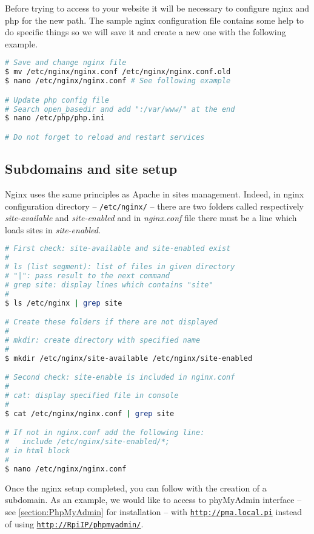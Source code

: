 Before trying to access to your website it will be necessary to configure nginx 
and php for the new path. The sample nginx configuration file contains some 
help to do specific things so we will save it and create a new one with the 
following example.

\begin{lstlisting}[language=bash,caption=Configure nginx and php]
# Save and change nginx file
$ mv /etc/nginx/nginx.conf /etc/nginx/nginx.conf.old
$ nano /etc/nginx/nginx.conf # See following example

# Update php config file
# Search open_basedir and add ":/var/www/" at the end
$ nano /etc/php/php.ini

# Do not forget to reload and restart services
\end{lstlisting} 
\lstset{language=bash,caption=nginx configuration}


\subsection{Subdomains and site setup}
Nginx uses the same principles as Apache in sites management. Indeed, in nginx 
configuration directory -- \texttt{/etc/nginx/} -- there are two folders called 
respectively \emph{site-available} and \emph{site-enabled} and in 
\emph{nginx.conf} file there must be a line which loads sites in 
\emph{site-enabled}.

\begin{lstlisting}[language=bash,caption=Nginx domains architecture]
# First check: site-available and site-enabled exist
#
# ls (list segment): list of files in given directory 
# "|": pass result to the next command
# grep site: display lines which contains "site"
# 
$ ls /etc/nginx | grep site

# Create these folders if there are not displayed
#
# mkdir: create directory with specified name
#
$ mkdir /etc/nginx/site-available /etc/nginx/site-enabled

# Second check: site-enable is included in nginx.conf
#
# cat: display specified file in console
#
$ cat /etc/nginx/nginx.conf | grep site

# If not in nginx.conf add the following line:
#   include /etc/nginx/site-enabled/*;
# in html block
#
$ nano /etc/nginx/nginx.conf
\end{lstlisting} 

Once the nginx setup completed, you can follow with the creation of a subdomain. 
As an example, we would like to access to phyMyAdmin interface -- see 
\ref{section:PhpMyAdmin} for installation -- with \href{http://pma.local.pi}
{\texttt{http://pma.local.pi}} instead of using \href{http://RpiIP/phpmyadmin/}
{\texttt{http://RpiIP/phpmyadmin/}}. 

